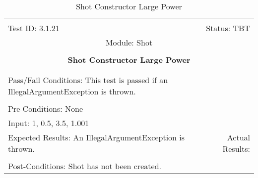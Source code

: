 \documentclass[titlepage]{article}
\begin{document}
\begin{center}%
\begin{table}
\begin{tabular}{|l r|}\hline&\\[-2mm]
	Test ID: 3.1.21	&Status: TBT\\[-3mm]
	\multicolumn{2}{|c|}{Module: Shot}\\&\\
	\multicolumn{2}{|c|}{\textbf{\large{Shot Constructor Large Power}}}\\&\\\hline&\\[-3mm]
	\multicolumn{2}{|p{\textwidth}|}{Pass/Fail Conditions: This test is passed if an IllegalArgumentException is thrown.}\\[1mm]\hline&\\[-3mm]
	\multicolumn{2}{|p{\textwidth}|}{Pre-Conditions: None}\\[4mm]
	\multicolumn{2}{|p{\textwidth}|}{Input: 1, 0.5, 3.5, 1.001}\\[2mm]\hline
	\multicolumn{1}{|p{0.49\textwidth}}{Expected Results: An IllegalArgumentException is thrown.}	&\multicolumn{1}{|p{0.45\textwidth}|}{Actual Results: }\\\hline&\\[-3mm]
	\multicolumn{2}{|p{\textwidth}|}{Post-Conditions: Shot has not been created.}\\\hline
\end{tabular}
\caption{Shot Constructor Large Power}
\end{table}
\end{center}
\end{document}
